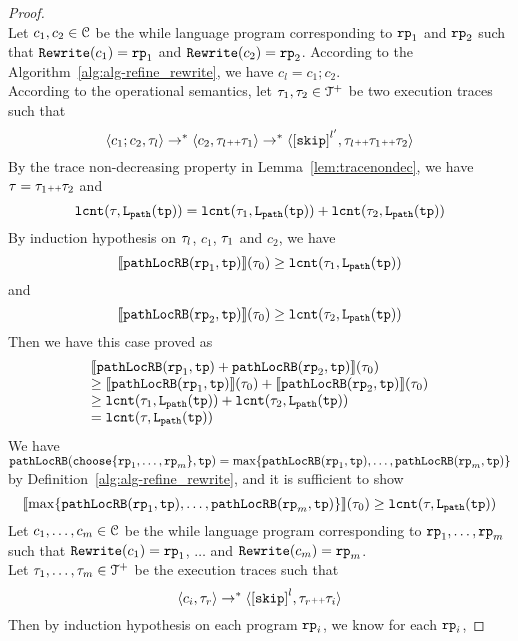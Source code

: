 \begin{proof}
\[\]
Let $c_1, c_2 \in \mathcal{C}$ be the while language program corresponding to $\mathtt{rp}_1$ and $\mathtt{rp}_2$ such that $\mathtt{Rewrite}(c_1) = \mathtt{rp}_1$ and $\mathtt{Rewrite}(c_2) = \mathtt{rp}_2$.
According to the Algorithm~\ref{alg:alg-refine_rewrite}, we have $c_l = c_1; c_2$.
\\
According to the operational semantics, let $\mathtt{\tau}_1, \mathtt{\tau}_2 \in \mathcal{T}^{+}$ be two execution traces such that 
\[
  \config{c_1; c_2, \trace_l} \to^* \config{c_2, \trace_l \tracecat \trace_1} \to^* \config{\clabel{\eskip}^{l'}, \trace_l \tracecat \trace_1 \tracecat \trace_2}
\]
By the trace non-decreasing property in Lemma~\ref{lem:tracenondec}, we have $\mathtt{\tau} = \mathtt{\tau}_1 {\scriptscriptstyle ++} \mathtt{\tau}_2$ and 
\[
  \mathtt{lcnt}(\mathtt{\tau}, \mathtt{L}_{\mathtt{path}}(\mathtt{tp}))  = \mathtt{lcnt}(\mathtt{\tau}_1,  \mathtt{L}_{\mathtt{path}}(\mathtt{tp}))  + \mathtt{lcnt}(\mathtt{\tau}_2,  \mathtt{L}_{\mathtt{path}}(\mathtt{tp})) 
\]
By induction hypothesis on $\mathtt{\tau}_l$, $c_1$, $\mathtt{\tau}_1$ and $c_2$, we have
\[
  \llbracket \mathtt{pathLocRB}(\mathtt{rp}_1, \mathtt{tp}) \rrbracket(\mathtt{\tau}_0) \geq \mathtt{lcnt}(\mathtt{\tau}_1,  \mathtt{L}_{\mathtt{path}}(\mathtt{tp})) 
\]
 and 
  \[
    \llbracket \mathtt{pathLocRB}(\mathtt{rp}_2, \mathtt{tp}) \rrbracket(\mathtt{\tau}_0) \geq \mathtt{lcnt}(\mathtt{\tau}_2,  \mathtt{L}_{\mathtt{path}}(\mathtt{tp})) 
  \]
Then we have this case proved as
\[
  \begin{array}{l}
  \llbracket \mathtt{pathLocRB}(\mathtt{rp}_1, \mathtt{tp}) + \mathtt{pathLocRB}(\mathtt{rp}_2, \mathtt{tp}) \rrbracket(\mathtt{\tau}_0)
  \\
  \geq \llbracket \mathtt{pathLocRB}(\mathtt{rp}_1, \mathtt{tp}) \rrbracket(\mathtt{\tau}_0) + \llbracket \mathtt{pathLocRB}(\mathtt{rp}_2, \mathtt{tp}) \rrbracket(\mathtt{\tau}_0)
  \\
  \geq \mathtt{lcnt}(\mathtt{\tau}_1,  \mathtt{L}_{\mathtt{path}}(\mathtt{tp}))  + \mathtt{lcnt}(\mathtt{\tau}_2,  \mathtt{L}_{\mathtt{path}}(\mathtt{tp})) 
  \\
  = \mathtt{lcnt}(\mathtt{\tau}, \mathtt{L}_{\mathtt{path}}(\mathtt{tp}))
  \end{array}
  \] 
We have $\outinB(\rpchoose{\rprog_1, \ldots, \rprog_m }, \tpath) = \max\left\{ \outinB(\rprog_1, \tpath), \ldots, \outinB(\rprog_m, \tpath) \right\}$ by Definition~\ref{alg:alg-refine_rewrite}, and
it is sufficient to show
\[
  \econfig{\max\left\{ \outinB(\rprog_1, \tpath), \ldots, \outinB(\rprog_m, \tpath) \right\}}(\trace_0) \geq \lcounter(\trace, \pathl(\tpath)) 
\]
Let $c_1, \ldots, c_m \in \mathcal{C}$ be the while language program corresponding to $\mathtt{rp}_1, \ldots, \mathtt{rp}_m$ such that $\mathtt{Rewrite}(c_1) = \mathtt{rp}_1$, $\ldots$ and  $\mathtt{Rewrite}(c_m) = \mathtt{rp}_m$.
\\
Let $\mathtt{\tau}_1, \ldots, \mathtt{\tau}_m \in \mathcal{T}^{+}$ be the execution traces such that 
\[
  \config{c_i, \trace_r} \to^* 
  \config{\clabel{\eskip}^{l}, \trace_r \tracecat \trace_i}
\]
Then by induction hypothesis on each program $\mathtt{rp}_i$, we know for each $\mathtt{rp}_i$,

\end{proof}

